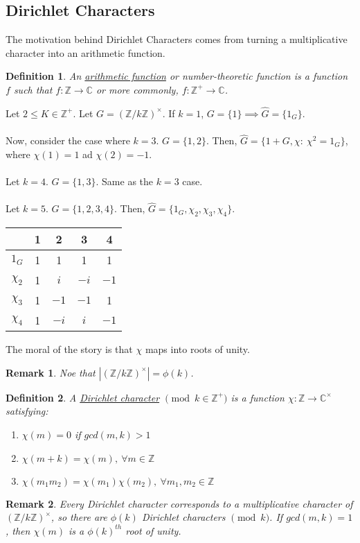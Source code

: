 \documentclass{article}
\newcommand{\C}{\mathbb{C}}
\newcommand{\Z}{\mathbb{Z}}
\newtheorem{remark}{Remark}[subsection]
\newtheorem{definition}{Definition}[subsection]
\begin{document}
\subsection{Dirichlet Characters}
The motivation behind Dirichlet Characters comes from turning a multiplicative character into an arithmetic function.
\begin{definition}
An \underline{arithmetic function} or number-theoretic function is a function $f$ such that $f:\Z\to \C$ or more commonly, $f:\Z^+\to\C$.
\end{definition}
Let $2\leq K\in \Z^+$. Let $G=(\Z/k\Z)^\times$. If $k=1$, $G=\{1\}\implies \widehat{G}=\{1_G\}$.\\
\\
Now, consider the case where $k=3$. $G=\{1,2\}$. Then, $\widehat{G}=\{1+G,\chi:\ \chi^2=1_G\}$, where $\chi(1)=1$ ad $\chi(2)=-1$.\\
\\
Let $k=4$. $G=\{1,3\}$. Same as the $k=3$ case.\\
\\
Let $k=5$. $G=\{1,2,3,4\}$. Then, $\widehat{G}=\{1_G,\chi_2,\chi_3,\chi_4\}$.
\begin{table}[H]
    \centering
    \begin{tabular}{c|cccc}
         & 1 & 2 & 3 & 4 \\\hline
    $1_G$  & 1 & 1 & 1 & 1\\
    $\chi_2$ & 1 & $i$ & $-i$ & $-1$\\
    $\chi_3$ & 1 & $-1$ & $-1$ & 1\\
    $\chi_4$ & 1 & $-i$ & $i$ & $-1$
    \end{tabular}
\end{table}
The moral of the story is that $\chi$ maps into roots of unity.
\begin{remark}
Noe that $|(\Z/k\Z)^\times|=\phi(k)$.
\end{remark}
\begin{definition}
A \underline{Dirichlet character} $\pmod{k\in\Z^+}$ is a function $\chi:\Z\to\C^\times$ satisfying:
\begin{enumerate}[1)]
    \item $\chi(m)=0$ if $gcd(m,k)>1$
    \item $\chi(m+k)=\chi(m),\ \forall m\in\Z$
    \item $\chi(m_1m_2)=\chi(m_1)\chi(m_2),\ \forall m_1,m_2\in\Z$
\end{enumerate}
\end{definition}
\begin{remark}
Every Dirichlet character corresponds to a multiplicative character of $(\Z/k\Z)^\times$, so there are $\phi(k)$ Dirichlet characters $\pmod{k}$. If $gcd(m,k)=1$, then $\chi(m)$ is a $\phi(k)^{th}$ root of unity.
\end{remark}
\end{document}

